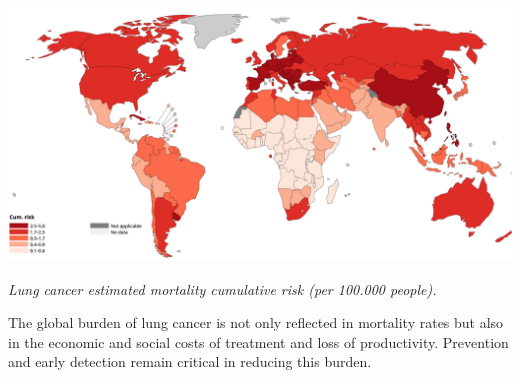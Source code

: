 \vspace{1em}
\begin{center}
    \includegraphics[width=1.00\textwidth]{assets/01-overview/lc-cumulative-risk.png}

    \small\textit{Lung cancer estimated mortality cumulative risk (per 100.000 people). 
    \cite{who2024}}
\end{center}
\vspace{1em}

The global burden of lung cancer is not only reflected in mortality rates but also in the economic 
and social costs of treatment and loss of productivity. Prevention and early detection remain 
critical in reducing this burden.
